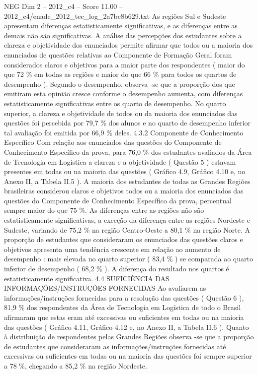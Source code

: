 \begin{textsample}{NEG Dim 2 – 2012\_c4 – Score 11.00 – 2012\_c4/enade\_2012\_tec\_log\_2a7bc8b629.txt}
As regiões Sul e Sudeste apresentam diferenças estatisticamente significativas, e as diferenças entre as demais não são significativas.
A análise das percepções dos estudantes sobre a clareza e objetividade dos enunciados permite afirmar que todos ou a maioria dos enunciados de questões relativas ao Componente de Formação Geral foram considerados claros e objetivos para a maior parte dos respondentes ( maior do que 72 \% em todas as regiões e maior do que 66 \% para todos os quartos de desempenho ).
Segundo o desempenho, observa -se que a proporção dos que emitiram esta opinião cresce conforme o desempenho aumenta, com diferenças estatisticamente significativas entre os quarto de desempenho.
No quarto superior, a clareza e objetividade de todos ou da maioria dos enunciados das questões foi percebida por 79,7 \% dos alunos e no quarto de desempenho inferior tal avaliação foi emitida por 66,9 \% deles. 4.3.2 Componente de Conhecimento Específico Com relação aos enunciados das questões do Componente de Conhecimento Específico da prova, para 76,0 \% dos estudantes avaliados da Área de Tecnologia em Logística a clareza e a objetividade ( Questão 5 ) estavam presentes em todas ou na maioria das questões ( Gráfico 4.9, Gráfico 4.10 e, no Anexo II, a Tabela II.5 ).
A maioria dos estudantes de todas as Grandes Regiões brasileiras considerou claros e objetivos todos ou a maioria dos enunciados das questões do Componente de Conhecimento Específico da prova, percentual sempre maior do que 75 \%.
As diferenças entre as regiões não são estatisticamente significativas, a exceção da diferença entre as regiões Nordeste e Sudeste, variando de 75,2 \% na região Centro-Oeste a 80,1 \% na região Norte.
A proporção de estudantes que consideraram os enunciados das questões claros e objetivos apresenta uma tendência crescente em relação ao aumento de desempenho : mais elevada no quarto superior ( 83,4 \% ) se comparada ao quarto inferior de desempenho ( 68,2 \% ).
A diferença do resultado nos quartos é estatisticamente significativa. 4.4 SUFICIÊNCIA DAS INFORMAÇÕES/INSTRUÇÕES FORNECIDAS Ao avaliarem as informações/instruções fornecidas para a resolução das questões ( Questão 6 ), 81,9 \% dos respondentes da Área de Tecnologia em Logística de todo o Brasil afirmaram que estas eram até excessivas ou suficientes em todas ou na maioria das questões ( Gráfico 4.11, Gráfico 4.12 e, no Anexo II, a Tabela II.6 ).
Quanto à distribuição de respondentes pelas Grandes Regiões observa -se que a proporção de estudantes que consideraram as informações/instruções fornecidas até excessivas ou suficientes em todas ou na maioria das questões foi sempre superior a 78 \%, chegando a 85,2 \% na região Nordeste.

\end{textsample}

